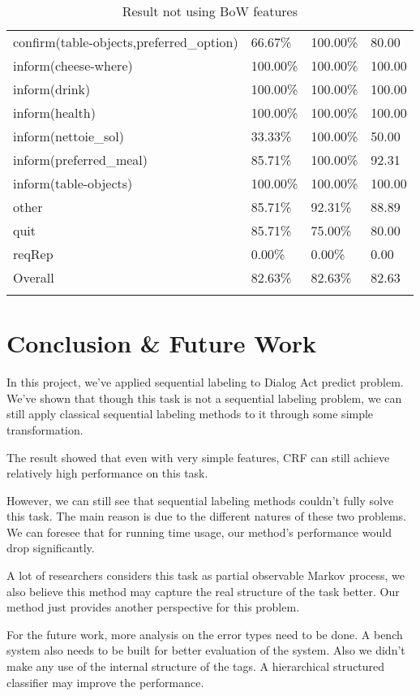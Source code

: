 \documentclass[a4paper]{article}
\begin{document}
\begin{longtable}{|l|l|l|l|}
        confirm(table-objects,preferred\_option) &   66.67\% & 100.00\% &  80.00 \\
        inform(cheese-where) &  100.00\% & 100.00\% & 100.00 \\
        inform(drink) &  100.00\% & 100.00\% & 100.00 \\
        inform(health) &  100.00\% & 100.00\% & 100.00 \\
        inform(nettoie\_sol) &   33.33\% & 100.00\% &  50.00 \\
        inform(preferred\_meal) &   85.71\% & 100.00\% &  92.31 \\
        inform(table-objects) &  100.00\% & 100.00\% & 100.00 \\
        other   &   85.71\% &  92.31\% &  88.89 \\
        quit    &   85.71\% &  75.00\% &  80.00 \\
        reqRep  &    0.00\% &   0.00\% &   0.00 \\\hline
        Overall &   82.63\% &  82.63\% &  82.63 \\\hline
    \caption{Result not using BoW features}
    \label{tab:nonbow}
    \end{longtable}

\section{Conclusion \& Future Work}
In this project, we've applied sequential labeling to Dialog Act predict problem. We've shown that though this task is not a sequential labeling problem, we can still apply classical sequential labeling methods to it through some simple transformation.

The result showed that even with very simple features, CRF can still achieve relatively high performance on this task.

However, we can still see that sequential labeling methods couldn't fully solve this task. The main reason is due to the different natures of these two problems. We can foresee that for running time usage, our method's performance would drop significantly. 

A lot of researchers considers this task as partial observable Markov process, we also believe this method may capture the real structure of the task better. Our method just provides another perspective for this problem.

For the future work, more analysis on the error types need to be done. A bench system also needs to be built for better evaluation of the system. Also we didn't make any use of the internal structure of the tags. A hierarchical structured classifier may improve the performance. 

%
\end{document}
